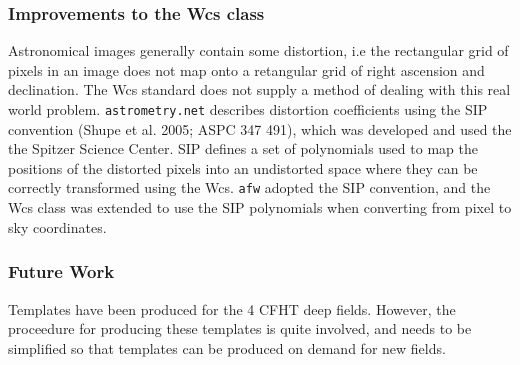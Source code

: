 \subsubsection{Improvements to the Wcs class}
Astronomical images generally contain some distortion, i.e the rectangular grid of pixels in an image does not map onto a retangular grid of right ascension and declination. The Wcs standard does not supply a method of dealing with this real world problem. {\tt astrometry.net} describes distortion coefficients using the SIP convention (Shupe et al. 2005; ASPC 347 491), which was developed and used the the Spitzer Science Center. SIP defines a set of polynomials used to map the positions of the distorted pixels into an undistorted space where they can be correctly transformed using the Wcs. {\tt afw} adopted the SIP convention, and the Wcs class was extended to use the SIP polynomials when converting from pixel to sky coordinates.


\subsubsection{Future Work}
Templates have been produced for the 4 CFHT deep fields. However, the proceedure for producing these templates is quite involved, and needs to be simplified so that templates can be produced on demand for new fields.
